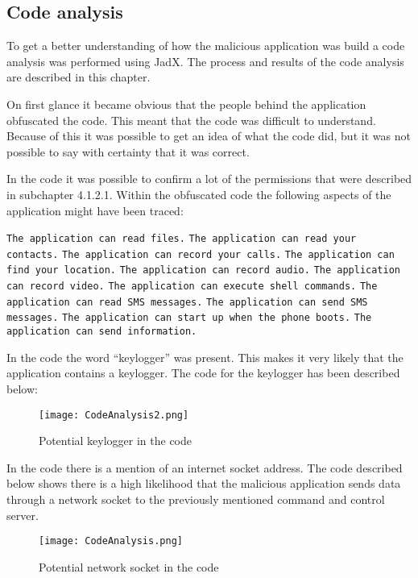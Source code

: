 \subsection{Code analysis}
To get a better understanding of how the malicious application was build a code analysis was performed using JadX.
The process and results of the code analysis are described in this chapter.

On first glance it became obvious that the people behind the application obfuscated the code.
This meant that the code was difficult to understand.
Because of this it was possible to get an idea of what the code did, but it was not possible to say with certainty that it was correct.

In the code it was possible to confirm a lot of the permissions that were described in subchapter 4.1.2.1.
Within the obfuscated code the following aspects of the application might have been traced:

\texttt{The application can read files.}
\newline \texttt{The application can read your contacts.}
\newline \texttt{The application can record your calls.}
\newline \texttt{The application can find your location.}
\newline \texttt{The application can record audio.}
\newline \texttt{The application can record video.}
\newline \texttt{The application can execute shell commands.}
\newline \texttt{The application can read SMS messages.}
\newline \texttt{The application can send SMS messages.}
\newline \texttt{The application can start up when the phone boots.}
\newline \texttt{The application can send information.}

In the code the word “keylogger” was present.
This makes it very likely that the application contains a keylogger.
The code for the keylogger has been described below:

\begin{figure}[H]
    \centering
    \texttt{[image: CodeAnalysis2.png]}
    \caption{Potential keylogger in the code}
    \label{jordy-keylogger}
\end{figure}

In the code there is a mention of an internet socket address.
The code described below shows there is a high likelihood that the malicious application sends data through a network socket to the previously mentioned command and control server. 

\begin{figure}[H]
    \centering
    \texttt{[image: CodeAnalysis.png]}
    \caption{Potential network socket in the code}
    \label{jordy-networksocket}
\end{figure}